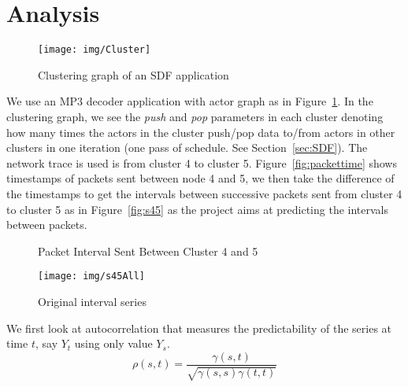 \documentclass[12pt]{article}
\begin{document}
\section{Analysis}
\begin{figure}[ht!]
\centering
\texttt{[image: img/Cluster]}
\caption{Clustering graph of an SDF application}\label{fig:Cluster}
\end{figure}

We use an MP3 decoder application with actor graph as in
Figure~\ref{fig:Cluster}. In the clustering graph, we see the \textit{push} and
\textit{pop} parameters in each cluster denoting how many times the actors in
the cluster push/pop data to/from actors in other clusters in one iteration
(one pass of schedule. See Section~\ref{sec:SDF}). The network trace is used is
from cluster 4 to cluster 5. Figure~\ref{fig:packettime} shows timestamps of
packets sent between node 4 and 5, we then take the difference of the timestamps
to get the intervals between successive packets sent from cluster 4 to cluster 5
as in Figure~\ref{fig:s45} as the project aims at predicting the intervals between packets.

\begin{figure*}[ht!]
\centering
{}
\caption{Packet Interval Sent Between Cluster 4 and 5}
\end{figure*}

\begin{figure}[ht!]
\centering
\texttt{[image: img/s45All]}
\caption{Original interval series}\label{fig:s45All}
\end{figure}

We first look at autocorrelation that measures the predictability of the series
at time $t$, say $Y_t$ using only value $Y_s$.
\begin{equation}
\rho(s,t)=\frac{\gamma(s,t)}{\sqrt{\gamma(s,s)\gamma(t,t)}}
\end{equation}
\end{document}
